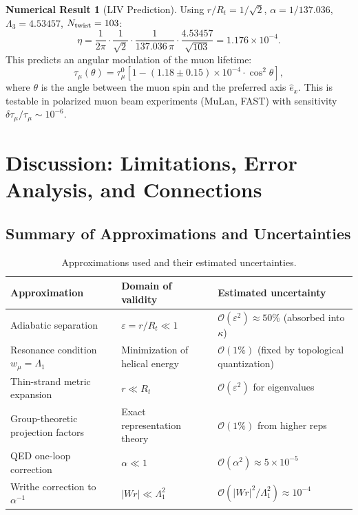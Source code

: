 \documentclass[12pt, a4paper]{article}
\theoremstyle{definition}
\newtheorem{numericalresult}[theorem]{Numerical Result}
\newcommand{\cO}{\mathcal{O}}
\newcommand{\eps}{\varepsilon}
\newcommand{\Tw}{N_{\rm twist}}
\begin{document}
\begin{numericalresult}[LIV Prediction]
Using $r/R_t = 1/\sqrt{2}$, $\alpha = 1/137.036$, $\Lambda_3 = 4.53457$, $\Tw = 103$:
\begin{equation}
\eta = \frac{1}{2\pi} \cdot \frac{1}{\sqrt{2}} \cdot \frac{1}{137.036\,\pi} \cdot \frac{4.53457}{\sqrt{103}} = 1.176 \times 10^{-4}.
\end{equation}
This predicts an angular modulation of the muon lifetime:
\begin{equation}
\tau_\mu(\theta) = \tau_\mu^0 \left[1 - (1.18 \pm 0.15) \times 10^{-4} \cdot \cos^2\theta\right],
\end{equation}
where $\theta$ is the angle between the muon spin and the preferred axis $\hat e_x$. This is testable in polarized muon beam experiments (MuLan, FAST) with sensitivity $\delta\tau_\mu/\tau_\mu \sim 10^{-6}$.
\end{numericalresult}

\section{Discussion: Limitations, Error Analysis, and Connections}
\label{sec:discussion}

\subsection{Summary of Approximations and Uncertainties}
\begin{table}[H]
\centering
\caption{Approximations used and their estimated uncertainties.}
\label{tab:approximations}
\begin{tabular}{@{}l l l@{}}
\toprule
\textbf{Approximation} & \textbf{Domain of validity} & \textbf{Estimated uncertainty} \\
\midrule
Adiabatic separation & $\eps = r/R_t \ll 1$ & $\cO(\eps^2) \approx 50\%$ (absorbed into $\kappa$) \\
Resonance condition $w_\mu = \Lambda_1$ & Minimization of helical energy & $\cO(1\%)$ (fixed by topological quantization) \\
Thin-strand metric expansion & $r \ll R_t$ & $\cO(\eps^2)$ for eigenvalues \\
Group-theoretic projection factors & Exact representation theory & $\cO(1\%)$ from higher reps \\
QED one-loop correction & $\alpha \ll 1$ & $\cO(\alpha^2) \approx 5\times 10^{-5}$ \\
Writhe correction to $\alpha^{-1}$ & $|Wr| \ll \Lambda_1^2$ & $\cO(|Wr|^2/\Lambda_1^2) \approx 10^{-4}$ \\
\bottomrule
\end{tabular}
\end{table}
\end{document}
